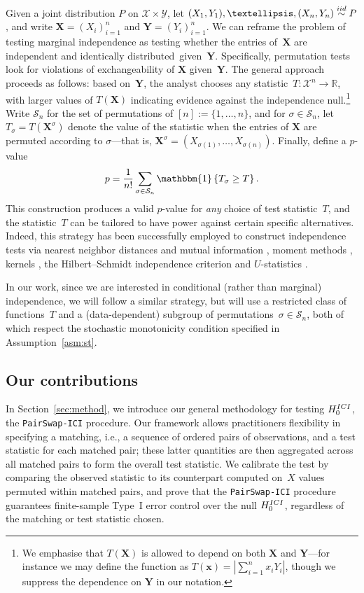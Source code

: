 \documentclass[12pt]{article}
\newcommand{\R}{\mathbb{R}}
\newcommand{\One}[1]{{\mathbbm{1}}\left\{{#1}\right\}}
\newcommand{\iidsim}{\stackrel{\textnormal{iid}}{\sim}}
\newcommand{\Xcal}{\mathcal{X}}
\newcommand{\bx}{\mathbf{x}}
\newcommand{\bX}{\mathbf{X}}
\newcommand{\bY}{\mathbf{Y}}
\begin{document}
Given a joint distribution $P$ on $\mathcal{X}\times\mathcal{Y}$, let $(X_1,Y_1),\ldots,(X_n,Y_n) \iidsim P$, and write $\bX = (X_i)_{i=1}^n$ and $\bY = (Y_i)_{i=1}^n$.  We can reframe the problem of testing marginal independence as testing whether the entries of~$\bX$ are independent and identically distributed~given~$\bY$. Specifically,   
permutation tests look for violations of exchangeability of $\bX$ given~$\bY$. The general approach proceeds as follows: based on~$\bY$, the analyst chooses any statistic~$T : \Xcal^n \to \R$, with larger values of $T(\bX)$ indicating evidence against the independence null.\footnote{We emphasise that $T(\bX)$ is allowed to depend on both $\bX$ and $\bY$---for instance we may define the function as $T(\bx) = |\sum_{i=1}^n x_i Y_i|$, though we suppress the dependence on $\bY$ in our notation.}  Write $\mathcal{S}_n$ for the set of permutations of $[n] := \{1,\ldots,n\}$, and for $\sigma \in \mathcal{S}_n$, let $T_\sigma = T(\bX^\sigma)$ denote the value of the statistic when the entries of $\bX$ are permuted according to $\sigma$---that is, $\bX^\sigma = (X_{\sigma(1)},\dots,X_{\sigma(n)})$. Finally, define a $p$-value
\[
p = \frac{1}{n!}\sum_{\sigma\in\mathcal{S}_n}\One{T_\sigma\ge T}.
\]
This construction produces a valid $p$-value for \emph{any} choice of test statistic~$T$, and the statistic~$T$ can be tailored to have power against certain specific alternatives.  Indeed, this strategy has been successfully employed to construct independence tests via nearest neighbor distances and mutual information \citep{berrett2019nonparametric}, moment methods \citep{kim2022minimax}, kernels \citep{pfister2018kernel}, the Hilbert--Schmidt independence criterion \citep{albert2022adaptive} and $U$-statistics \citep{berrett2021usp,berrett2021optimal}.

In our work, since we are interested in conditional (rather than  marginal) independence, we will follow a similar strategy, but will use a restricted class of functions~$T$ and a (data-dependent) subgroup of permutations~$\sigma\in \mathcal{S}_n$, both of which respect the stochastic monotonicity condition specified in Assumption~\ref{asm:st}.

\subsection{Our contributions}
In Section~\ref{sec:method}, we introduce our general methodology for testing $H_0^{\textnormal{ICI}}$, the \textnormal{\texttt{PairSwap-ICI}} procedure. Our framework allows practitioners flexibility in specifying a matching, i.e., a sequence of ordered pairs of observations, and a test statistic for each matched pair; these latter quantities are then aggregated across all matched pairs to form the overall test statistic. We calibrate the test by comparing the observed statistic to its counterpart computed on~$X$ values permuted within matched pairs, and prove that the \textnormal{\texttt{PairSwap-ICI}} procedure guarantees finite-sample Type~I error control over the null $H_0^{\textnormal{ICI}}$, regardless of the matching or test statistic chosen.
\end{document}
